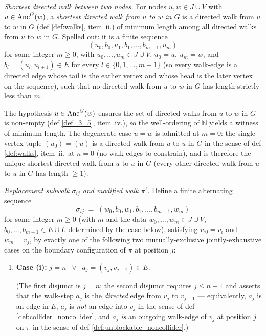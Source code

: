 \begin{Lem}[LabelRoman]
    \emph{Shortest directed walk between two nodes.}
    For nodes $u, w \in J \cup V$ with $u \in \mathrm{Anc}^G(w)$, a \emph{shortest directed walk from $u$ to $w$ in $G$} is a directed walk from $u$ to $w$ in $G$ (def \ref{def:walks}, item~ii.) of minimum length among all directed walks from $u$ to $w$ in $G$. Spelled out: it is a finite sequence
    \[
        (u_0, b_0, u_1, b_1, \dots, b_{m-1}, u_m)
    \]
    for some integer $m \ge 0$, with $u_0, \dots, u_m \in J \cup V$, $u_0 = u$, $u_m = w$, and $b_l = (u_l, u_{l+1}) \in E$ for every $l \in \{0, 1, \dots, m - 1\}$ (so every walk-edge is a directed edge whose tail is the earlier vertex and whose head is the later vertex on the sequence), such that no directed walk from $u$ to $w$ in $G$ has length strictly less than $m$.

    The hypothesis $u \in \mathrm{Anc}^G(w)$ ensures the set of directed walks from $u$ to $w$ in $G$ is non-empty (def \ref{def_3_5}, item~iv.), so the well-ordering of $\mathbb{N}$ yields a witness of minimum length. The degenerate case $u = w$ is admitted at $m = 0$: the single-vertex tuple $(u_0) = (u)$ is a directed walk from $u$ to $u$ in $G$ in the sense of def \ref{def:walks}, item~ii.\ at $n = 0$ (no walk-edges to constrain), and is therefore the unique shortest directed walk from $u$ to $u$ in $G$ (every other directed walk from $u$ to $u$ in $G$ has length $\ge 1$).

    \emph{Replacement subwalk $\sigma_{ij}$ and modified walk $\pi'$.}
    Define a finite alternating sequence
    \[
        \sigma_{ij} \;=\; (w_0, b_0, w_1, b_1, \dots, b_{m-1}, w_m)
    \]
    for some integer $m \ge 0$ (with $m$ and the data $w_0, \dots, w_m \in J \cup V$, $b_0, \dots, b_{m-1} \in E \cup L$ determined by the case below), satisfying $w_0 = v_i$ and $w_m = v_j$, by exactly one of the following two mutually-exclusive jointly-exhaustive cases on the boundary configuration of $\pi$ at position $j$:

    \begin{enumerate}[label=(\roman*)]
        \item \textbf{Case (i):} $j = n \;\;\lor\;\; a_j = (v_j, v_{j+1}) \in E$.

            (The first disjunct is $j = n$; the second disjunct requires $j \le n - 1$ and asserts that the walk-step $a_j$ is the \emph{directed} edge from $v_j$ to $v_{j+1}$ — equivalently, $a_j$ is an edge in $E$, $a_j$ is \emph{not} an edge into $v_j$ in the sense of def \ref{def:collider_noncollider}, and $a_j$ \emph{is} an outgoing walk-edge of $v_j$ at position $j$ on $\pi$ in the sense of def \ref{def:unblockable_noncollider}.)


\end{enumerate}
\end{Lem}

